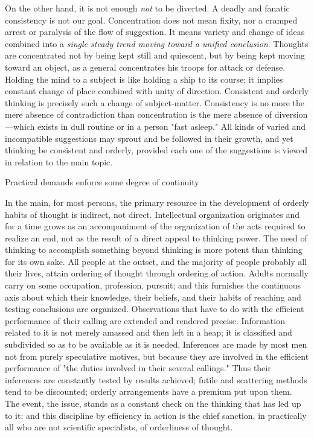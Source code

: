 \documentclass[letterpaper]{book}
\begin{document}
On the other hand, it is not enough \emph{not} to be diverted. A deadly
and fanatic consistency is not our goal. Concentration does not mean
fixity, nor a cramped arrest or paralysis of the flow of suggestion. It
means variety and change of ideas combined into a \emph{single steady
trend moving toward a unified conclusion}. Thoughts are concentrated not
by being kept still and quiescent, but by being kept moving toward an
object, as a general concentrates his troops for attack or defense.
Holding the mind to a subject is like holding a ship to its course; it
implies constant change of place combined with unity of direction.
Consistent and orderly thinking is precisely such a change of
subject-matter. Consistency is no more the mere absence of contradiction
than concentration is the mere absence of diversion---which exists in
dull routine or in a person "fast asleep." All kinds of varied and
incompatible suggestions may sprout and be followed in their growth, and
yet thinking be consistent and orderly, provided each one of the
suggestions is viewed in relation to the main topic.

Practical demands enforce some degree of continuity

In the main, for most persons, the primary
resource
in the development of orderly habits of thought is indirect, not direct.
Intellectual organization originates and for a time grows as an
accompaniment of the organization of the acts required to realize an
end, not as the result of a direct appeal to thinking power. The need of
thinking to accomplish something beyond thinking is more potent than
thinking for its own sake. All people at the outset, and the majority of
people probably all their lives, attain ordering of thought through
ordering of action. Adults normally carry on some occupation,
profession, pursuit; and this furnishes the continuous axis about which
their knowledge, their beliefs, and their habits of reaching and testing
conclusions are organized. Observations that have to do with the
efficient performance of their calling are extended and rendered
precise. Information related to it is not merely amassed and then left
in a heap; it is classified and subdivided so as to be available as it
is needed. Inferences are made by most men not from purely speculative
motives, but because they are involved in the efficient performance of
"the duties involved in their several callings." Thus their inferences
are constantly tested by results achieved; futile and scattering methods
tend to be discounted; orderly arrangements have a premium put upon
them. The event, the issue, stands as a constant check on the thinking
that has led up to it; and this discipline by efficiency in action is
the chief sanction, in practically all who are not scientific
specialists, of orderliness of thought.
\end{document}
